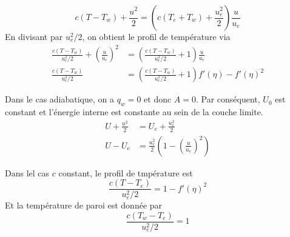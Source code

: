       \begin{equation}
        c(T-T_w) + \frac{u^2}{2} = \left(c(T_e + T_w) + \frac{u_e^2}{2}\right)\frac{u}{u_e}
      \end{equation}
      En divisant par $u_e^2/2$, on obtient le profil de température via
      \begin{equation}
        \begin{aligned}
          \frac{c(T-T_w)}{u_e^2/2} + \left(\frac{u}{u_e}\right)^2 &= \left(\frac{c(T-T_w)}{u_e^2/2} + 1\right) \frac{u}{u_e}\\
          \frac{c(T-T_w)}{u_e^2/2} &= \left(\frac{c(T-T_w)}{u_e^2/2} + 1\right) f'(\eta) - f'(\eta)^2
        \end{aligned}
      \end{equation}

      Dans le cas adiabatique, on a $q_w = 0$ et donc $A=0$. Par conséquent, $U_0$ est constant et l'énergie interne est constante au sein de la couche limite.
      \begin{equation}
        \begin{aligned}
          U + \frac{u^2}{2} &= U_e + \frac{u_e^2}{2} \\
          U - U_e &= \frac{u_e^2}{2} \left(1 - \left(\frac{u}{u_e}\right)^2\right)
        \end{aligned}
      \end{equation}

      Dans lel cas $c$ constant, le profil de tmpérature est
      \begin{equation}
        \frac{c(T-T_e)}{u_e^2/2} = 1 - f'(\eta)^2
      \end{equation}
      Et la température de paroi est donnée par
      \begin{equation}
        \frac{c(T_w - T_e)}{u_e^2/2} = 1
      \end{equation}

